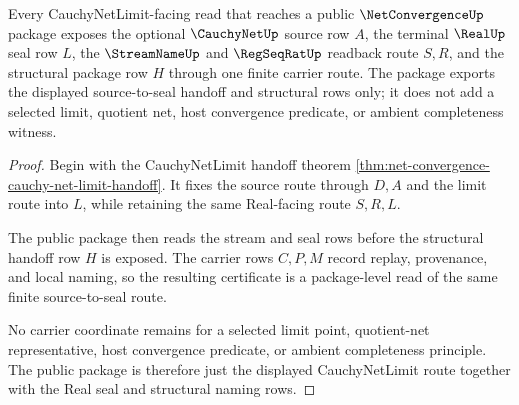 \begin{theorem}
\label{thm:net-convergence-cauchy-net-limit-public-package}
Every CauchyNetLimit-facing read that reaches a public $\NetConvergenceUp$ package exposes the optional $\CauchyNetUp$ source row $A$, the terminal $\RealUp$ seal row $L$, the $\StreamNameUp$ and $\RegSeqRatUp$ readback route $S,R$, and the structural package row $H$ through one finite carrier route. The package exports the displayed source-to-seal handoff and structural rows only; it does not add a selected limit, quotient net, host convergence predicate, or ambient completeness witness.
\end{theorem}
\begin{proof}
Begin with the CauchyNetLimit handoff theorem \autoref{thm:net-convergence-cauchy-net-limit-handoff}. It fixes the source route through $D,A$ and the limit route into $L$, while retaining the same Real-facing route $S,R,L$.

The public package then reads the stream and seal rows before the structural handoff row $H$ is exposed. The carrier rows $C,P,M$ record replay, provenance, and local naming, so the resulting certificate is a package-level read of the same finite source-to-seal route.

No carrier coordinate remains for a selected limit point, quotient-net representative, host convergence predicate, or ambient completeness principle. The public package is therefore just the displayed CauchyNetLimit route together with the Real seal and structural naming rows.
\end{proof}

